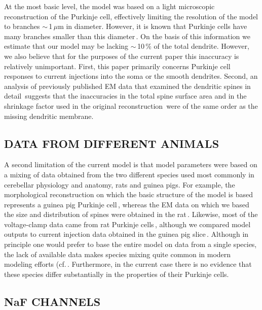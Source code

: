 \documentclass[12pt]{article}
\begin{document}
At the most basic level, the model
was based on a light microscopic reconstruction of the Purkinje
cell, effectively limiting the resolution of the model to
branches $\sim$\,1\,$\mu$m in diameter. However, it is known that
Purkinje cells have many branches smaller than this diameter\,\cite{Gundappa-Sulur:1990bs, Palay:1974fk}. 
On the basis of this information we estimate that
our model may be lacking $\sim$\,10\,\% of the total dendrite. However,
we also believe that for the purposes of the current
paper this inaccuracy is relatively unimportant. First, this
paper primarily concerns Purkinje cell responses to current
injections into the soma or the smooth dendrites. Second,
an analysis of previously published EM data that examined
the dendritic spines in detail\,\cite{M:1988bh, Harvey:1991xz} 
suggests that the inaccuracies in
the total spine surface area and in the shrinkage factor used
in the original reconstruction\,\cite{Rapp-M:1994qf} were of the
same order as the missing dendritic membrane.

\subsection*{DATA FROM DIFFERENT ANIMALS}

A second limitation of
the current model is that model parameters were based on a
mixing of data obtained from the two different species used
most commonly in cerebellar physiology and anatomy, rats
and guinea pigs. For example, the morphological reconstruction
on which the basic structure of the model is based
represents a guinea pig Purkinje cell\,\cite{Rapp-M:1994qf},
whereas the EM data on which we based the size and distribution
of spines were obtained in the rat\,\cite{M:1988bh}. 
Likewise, most of the voltage-clamp data came
from rat Purkinje cells\,\cite{Gahwiler:1989fk, Hirano:1989uq, Kaneda:1990ys, Regan:1991ly}, 
although we compared model outputs to current injection
data obtained in the guinea pig slice\,\cite{R:1980ly, R:1980pi}. 
Although in principle one would prefer to base
the entire model on data from a single species, the lack of
available data makes species mixing quite common in modern
modeling efforts (cf.\,\cite{bhalla92:_rallp, W:1991qa, McCormick:1992fk, Traub-R-D:1991mi}. 
Furthermore, in the current case there is
no evidence that these species differ substantially in the
properties of their Purkinje cells.

\subsection*{NaF CHANNELS}
\end{document}
